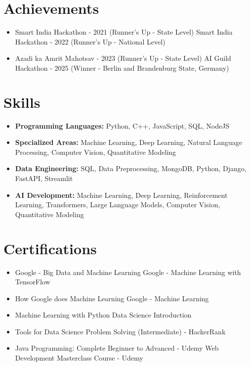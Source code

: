 \documentclass[a4paper,10pt]{article}
\begin{document}
\section*{Achievements}
\begin{itemize}
\item Smart India Hackathon - 2021 (Runner's Up - State Level) \hfill Smart India Hackathon - 2022 (Runner's Up - National Level)
\item Azadi ka Amrit Mahotsav - 2023 (Runner's Up - State Level) \hfill AI Guild Hackathon - 2025 (Winner - Berlin and Brandenburg State, Germany)
\end{itemize}

\section*{Skills}
\begin{itemize}
  \item \textbf{Programming Languages:} Python, C++, JavaScript, SQL, NodeJS
  \item \textbf{Specialized Areas:} Machine Learning, Deep Learning, Natural Language Processing, Computer Vision, Quantitative Modeling
  \item \textbf{Data Engineering:} SQL, Data Preprocessing, MongoDB, Python, Django, FastAPI, Streamlit
  \item \textbf{AI Development:} Machine Learning, Deep Learning, Reinforcement Learning, Transformers, Large Language Models, Computer Vision, Quantitative Modeling
\end{itemize}

\section*{Certifications}
\begin{itemize}
\item Google - Big Data and Machine Learning \hfill Google - Machine Learning with TensorFlow
\item How Google does Machine Learning \hfill Google - Machine Learning
\item Machine Learning with Python \hfill Data Science Introduction
\item Tools for Data Science \hfill Problem Solving (Intermediate) - HackerRank
\item Java Programming: Complete Beginner to Advanced - Udemy \hfill Web Development Masterclass Course - Udemy
\end{itemize}
\end{document}
